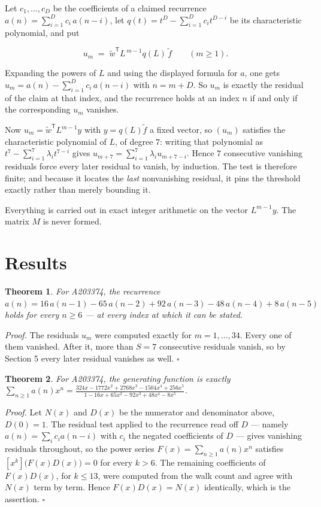 \documentclass[11pt]{article}
\newtheorem{theorem}{Theorem}
\theoremstyle{definition}
\begin{document}
Let $c_1,\dots,c_D$ be the coefficients of a claimed recurrence $a(n) = \sum_{i=1}^{D} c_i\,a(n-i)$, let $q(t) = t^{D} - \sum_{i=1}^{D} c_i t^{D-i}$ be its characteristic polynomial, and put

\[u_m \;=\; \tilde w^{\mathsf T} L^{\,m-1} q(L)\,\tilde f \qquad (m \ge 1).\]

Expanding the powers of $L$ and using the displayed formula for $a$, one gets $u_m = a(n) - \sum_{i=1}^{D} c_i\,a(n-i)$ with $n = m + D$. So $u_m$ is exactly the residual of the claim at that index, and the recurrence holds at an index $n$ if and only if the corresponding $u_m$ vanishes.

Now $u_m = \tilde w^{\mathsf T} L^{m-1} y$ with $y = q(L)\tilde f$ a fixed vector, so $(u_m)$ satisfies the characteristic polynomial of $L$, of degree $7$: writing that polynomial as $t^{7} - \sum_{i=1}^{7} \lambda_i t^{7-i}$ gives $u_{m+7} = \sum_{i=1}^{7} \lambda_i u_{m+7-i}$. Hence $7$ consecutive vanishing residuals force every later residual to vanish, by induction. The test is therefore finite; and because it locates the {\itshape last} nonvanishing residual, it pins the threshold exactly rather than merely bounding it.

Everything is carried out in exact integer arithmetic on the vector $L^{m-1}y$. The matrix $M$ is never formed.

\section{Results}

\begin{theorem} For A203374, the recurrence $a(n) = 16\,a(n-1) - 65\,a(n-2) + 92\,a(n-3) - 48\,a(n-4) + 8\,a(n-5)$ holds for every $n \ge 6$ --- at every index at which it can be stated.\end{theorem}

{\itshape Proof.} The residuals $u_m$ were computed exactly for $m = 1,\dots,34$. Every one of them vanished. After it, more than $S = 7$ consecutive residuals vanish, so by Section 5 every later residual vanishes as well. $\square$

\begin{theorem} For A203374, the generating function is exactly $\sum_{n\ge 1} a(n)x^n = \frac{324x - 1772x^{2} + 2768x^{3} - 1504x^{4} + 256x^{5}}{1 - 16x + 65x^{2} - 92x^{3} + 48x^{4} - 8x^{5}}$.\end{theorem}

{\itshape Proof.} Let $N(x)$ and $D(x)$ be the numerator and denominator above, $D(0)=1$. The residual test applied to the recurrence read off $D$ --- namely $a(n) = \sum_i c_i a(n-i)$ with $c_i$ the negated coefficients of $D$ --- gives vanishing residuals throughout, so the power series $F(x)=\sum_{n\ge 1}a(n)x^n$ satisfies $[x^k]\bigl(F(x)D(x)\bigr) = 0$ for every $k > 6$. The remaining coefficients of $F(x)D(x)$, for $k \le 13$, were computed from the walk count and agree with $N(x)$ term by term. Hence $F(x)D(x) = N(x)$ identically, which is the assertion. $\square$
\end{document}
